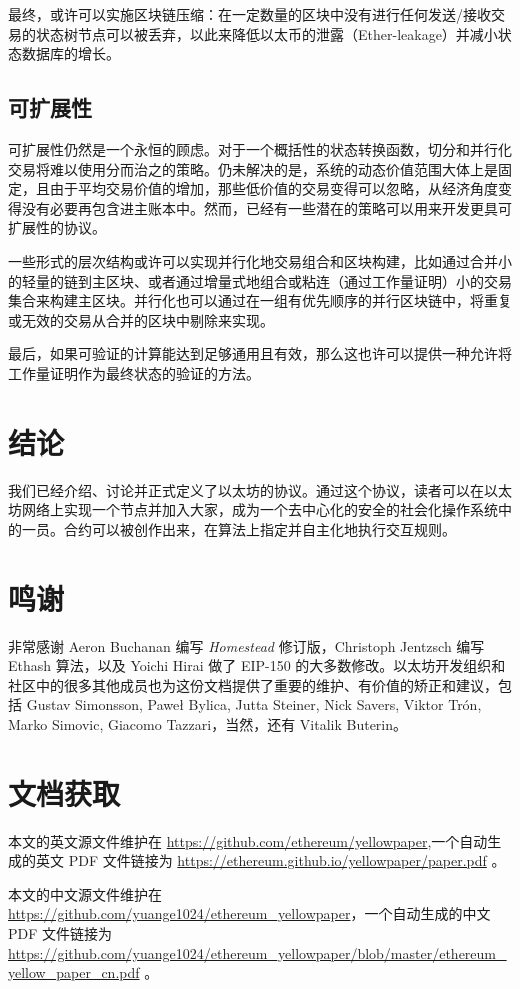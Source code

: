 \documentclass[9pt,oneside]{amsart}
\begin{document}
\begin{multicols}{2}
最终，或许可以实施区块链压缩：在一定数量的区块中没有进行任何发送/接收交易的状态树节点可以被丢弃，以此来降低以太币的泄露（Ether-leakage）并减小状态数据库的增长。

\subsection{可扩展性}

可扩展性仍然是一个永恒的顾虑。对于一个概括性的状态转换函数，切分和并行化交易将难以使用分而治之的策略。仍未解决的是，系统的动态价值范围大体上是固定，且由于平均交易价值的增加，那些低价值的交易变得可以忽略，从经济角度变得没有必要再包含进主账本中。然而，已经有一些潜在的策略可以用来开发更具可扩展性的协议。

一些形式的层次结构或许可以实现并行化地交易组合和区块构建，比如通过合并小的轻量的链到主区块、或者通过增量式地组合或粘连（通过工作量证明）小的交易集合来构建主区块。并行化也可以通过在一组有优先顺序的并行区块链中，将重复或无效的交易从合并的区块中剔除来实现。

最后，如果可验证的计算能达到足够通用且有效，那么这也许可以提供一种允许将工作量证明作为最终状态的验证的方法。

\section{结论} \label{ch:conclusion}

我们已经介绍、讨论并正式定义了以太坊的协议。通过这个协议，读者可以在以太坊网络上实现一个节点并加入大家，成为一个去中心化的安全的社会化操作系统中的一员。合约可以被创作出来，在算法上指定并自主化地执行交互规则。

\section{鸣谢}

非常感谢 Aeron Buchanan 编写 \textit{Homestead} 修订版，Christoph Jentzsch 编写 Ethash 算法，以及 Yoichi Hirai 做了 EIP-150 的大多数修改。以太坊开发组织和社区中的很多其他成员也为这份文档提供了重要的维护、有价值的矫正和建议，包括 Gustav Simonsson, Pawe\l{} Bylica, Jutta Steiner, Nick Savers, Viktor Tr\'{o}n, Marko Simovic, Giacomo Tazzari，当然，还有 Vitalik Buterin。

\section{文档获取}

本文的英文源文件维护在 \url{https://github.com/ethereum/yellowpaper},一个自动生成的英文 PDF 文件链接为 \url{https://ethereum.github.io/yellowpaper/paper.pdf} 。

本文的中文源文件维护在 \url{https://github.com/yuange1024/ethereum_yellowpaper}，一个自动生成的中文 PDF 文件链接为 \url{https://github.com/yuange1024/ethereum_yellowpaper/blob/master/ethereum_yellow_paper_cn.pdf} 。




\end{multicols}
\end{document}
